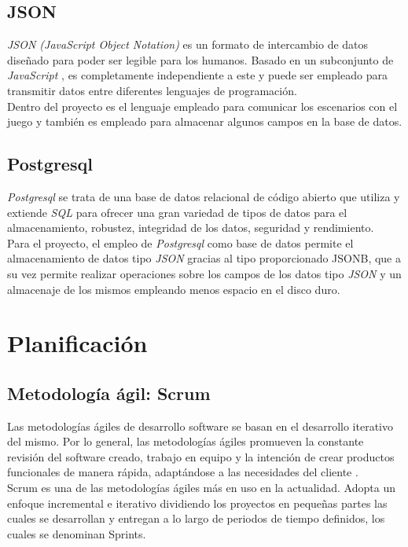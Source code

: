 \subsection{JSON}
\textit{JSON (JavaScript Object Notation)} \cite{json} es un formato de intercambio de datos diseñado para poder ser legible para los humanos. Basado en un subconjunto de \textit{JavaScript} \cite{javascript}, es completamente independiente a este y puede ser empleado para transmitir datos entre diferentes lenguajes de programación.
\\

Dentro del proyecto es el lenguaje empleado para comunicar los escenarios con el juego y también es empleado para almacenar algunos campos en la base de datos.

\subsection{Postgresql}
\textit{Postgresql} \cite{postgres} se trata de una base de datos relacional de código abierto que utiliza y extiende \textit{SQL} para ofrecer una gran variedad de tipos de datos para el almacenamiento, robustez, integridad de los datos, seguridad y rendimiento.
\\

Para el proyecto, el empleo de \textit{Postgresql} como base de datos permite el almacenamiento de datos tipo \textit{JSON} gracias al tipo proporcionado JSONB, que a su vez permite realizar operaciones sobre los campos de los datos tipo \textit{JSON} y un almacenaje de los mismos empleando menos espacio en el disco duro.

\section{Planificación}
\subsection{Metodología ágil: Scrum}
Las metodologías ágiles de desarrollo software se basan en el desarrollo iterativo del mismo. Por lo general, las metodologías ágiles promueven la constante revisión del software creado, trabajo en equipo y la intención de crear productos funcionales de manera rápida, adaptándose a las necesidades del cliente \cite{agile_scrum} \cite{scrum_events} \cite{scrum_artifacts}.
\\

Scrum es una de las metodologías ágiles más en uso en la actualidad. Adopta un enfoque incremental e iterativo dividiendo los proyectos en pequeñas partes las cuales se desarrollan y entregan a lo largo de periodos de tiempo definidos, los cuales se denominan Sprints.
\\


